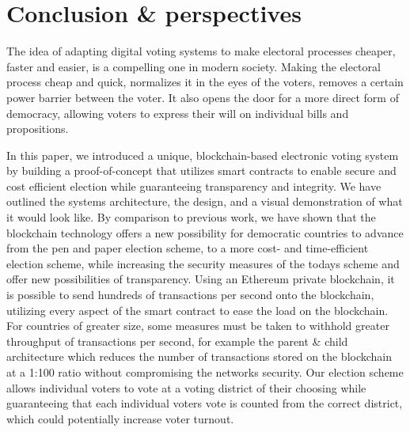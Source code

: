 \chapter{Conclusion \& perspectives}

The idea of adapting digital voting systems to make electoral processes cheaper, faster and easier, is a compelling
one in modern society. Making the electoral process cheap
and quick, normalizes it in the eyes of the voters, removes a
certain power barrier between the voter. It also opens the door for a more direct form of democracy, allowing voters to express their will on individual bills and propositions.

In this paper, we introduced a unique, blockchain-based electronic voting system by building a proof-of-concept that utilizes smart contracts to enable secure and cost efficient election while guaranteeing transparency and integrity. We have outlined the systems architecture, the design, and a visual demonstration of what it would look like. By comparison to previous work, we have shown that the blockchain technology offers a new possibility for democratic countries to advance from the pen and paper election scheme, to a more cost- and time-efficient election scheme, while increasing the security measures of the todays scheme and offer new possibilities of transparency. Using an Ethereum private blockchain, it is possible to send hundreds of transactions per second onto the blockchain, utilizing every aspect of the smart contract to ease the load on the blockchain. For countries of greater size, some measures must be taken to withhold greater throughput of transactions per second, for example the parent \& child architecture which reduces the number of transactions stored on the blockchain at a 1:100 ratio without compromising the networks security. Our election scheme allows individual voters to vote at a voting district of their choosing while guaranteeing that each individual voters vote is counted from the correct district, which could potentially increase voter turnout.


